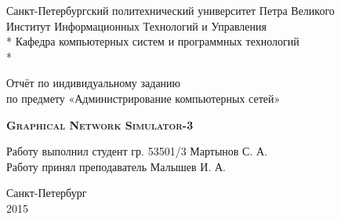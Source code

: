 \begin{titlepage}
\thispagestyle{empty}

\begin{center}
Санкт-Петербургский политехнический университет Петра Великого\\
Институт Информационных Технологий и Управления \\*
Кафедра компьютерных систем и программных технологий \\*
\hrulefill
\end{center}

\vspace{15em}

\begin{center}
\Large Отчёт по индивидуальному заданию\\по предмету «Администрирование компьютерных сетей» \\
\end{center}

\vspace{1em}

\begin{center}
\textsc{\textbf{Graphical Network Simulator-3}}
\end{center}

\vspace{20em}

\begin{flushleft}
Работу выполнил студент гр. 53501/3 \hrulefill Мартынов С. А. \\
\vspace{1.5em}
Работу принял преподаватель \hrulefill Малышев И. А. \\
\end{flushleft}

\vspace{\fill}

\begin{center}
Санкт-Петербург \\
2015
\end{center}

\end{titlepage}
\setcounter{page}{2}